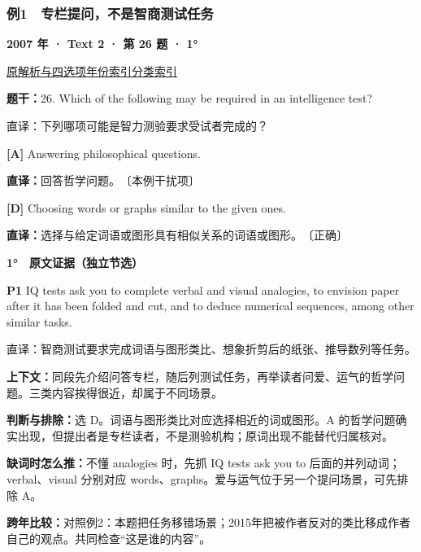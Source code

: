 \documentclass[11pt,a4paper]{article}
\begin{document}
\subsubsection{例1　专栏提问，不是智商测试任务}\label{case-2007-T2-Q26}
\noindent\textbf{2007 年 · Text 2 · 第 26 题 · 1°}\par\noindent \href{https://zj139.github.io/math-notes/english/eee8045d74a87e7be65b79fe/\#q26}{原解析与四选项}\quad \hyperref[idx-2007-T2-Q26]{年份索引}\quad \hyperref[class-R01]{分类索引}\par\smallskip
\noindent\textbf{题干：}26. Which of the following may be required in an intelligence test?\par
直译：下列哪项可能是智力测验要求受试者完成的？\par
{}\noindent\textbf{[A]} Answering philosophical questions.\par\nopagebreak
\noindent\textbf{直译：}回答哲学问题。　〔本例干扰项〕\par
{}\noindent\textbf{[D]} Choosing words or graphs similar to the given ones.\par\nopagebreak
\noindent\textbf{直译：}选择与给定词语或图形具有相似关系的词语或图形。　〔正确〕\par
\begin{evidence}\textbf{1°　原文证据（独立节选）}\par
\textbf{P1} IQ tests ask you to complete verbal and visual analogies, to envision paper after it has been folded and cut, and to deduce numerical sequences, among other similar tasks.\par 直译：智商测试要求完成词语与图形类比、想象折剪后的纸张、推导数列等任务。\par
\end{evidence}
\noindent\textbf{上下文：}同段先介绍问答专栏，随后列测试任务，再举读者问爱、运气的哲学问题。三类内容挨得很近，却属于不同场景。\par
\noindent\textbf{判断与排除：}选 D。词语与图形类比对应选择相近的词或图形。A 的哲学问题确实出现，但提出者是专栏读者，不是测验机构；原词出现不能替代归属核对。\par
\noindent\textbf{缺词时怎么推：}不懂 analogies 时，先抓 IQ tests ask you to 后面的并列动词；verbal、visual 分别对应 words、graphs。爱与运气位于另一个提问场景，可先排除 A。\par
\noindent\textbf{跨年比较：}对照例2：本题把任务移错场景；2015年把被作者反对的类比移成作者自己的观点。共同检查“这是谁的内容”。\par
\clearpage
\end{document}
